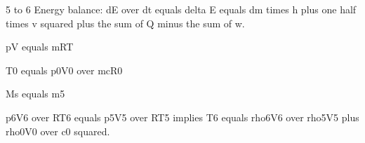 5 to 6 Energy balance:
dE over dt equals delta E equals dm times h plus one half times v squared plus the sum of Q minus the sum of w.

pV equals mRT

T0 equals p0V0 over mcR0

Ms equals m5

p6V6 over RT6 equals p5V5 over RT5 implies T6 equals rho6V6 over rho5V5 plus rho0V0 over c0 squared.